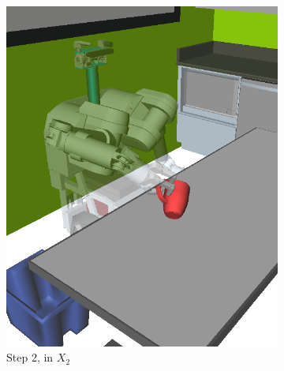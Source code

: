 \begin{figure}
\begin{widepage}
\begin{subfigure}[t]{0.185\linewidth}
\includegraphics[width=\columnwidth]{figs/testherb-c.png}
\caption{Step 2, in $X_2$}
\end{subfigure}
\begin{subfigure}[t]{0.185\linewidth}
\centering

\end{subfigure}
\end{widepage}
\end{figure}
